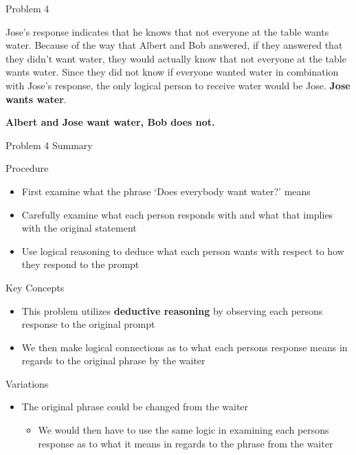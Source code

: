 \begin{problem}{Problem 4}
\begin{highlight}[Solution]
        Jose's response indicates that he knows that not everyone at the table wants water. Because of the way that Albert and Bob answered, if they answered that they didn't want water, they would actually know
        that not everyone at the table wants water. Since they did not know if everyone wanted water in combination with Jose's response, the only logical person to receive water would be Jose. \textbf{Jose wants
        water}.

        \begin{center}
            \textbf{Albert and Jose want water, Bob does not.}
        \end{center}
    \end{highlight}
\end{problem}

\begin{summary}{Problem 4 Summary}
    \begin{statement}{Procedure}
        \begin{itemize}
            \item First examine what the phrase `Does everybody want water?' means
            \item Carefully examine what each person responds with and what that implies with the original statement
            \item Use logical reasoning to deduce what each person wants with respect to how they respond to the prompt
        \end{itemize}
    \end{statement}
    \begin{statement}{Key Concepts}
        \begin{itemize}
            \item This problem utilizes \textbf{deductive reasoning} by observing each persons response to the original prompt
            \item We then make logical connections as to what each persons response means in regards to the original phrase by the waiter
        \end{itemize}
    \end{statement}
    \begin{statement}{Variations}
        \begin{itemize}
            \item The original phrase could be changed from the waiter
            \begin{itemize}
                \item We would then have to use the same logic in examining each persons response as to what it means in regards to the phrase from the waiter

\end{itemize}
\end{itemize}
\end{statement}
\end{summary}
